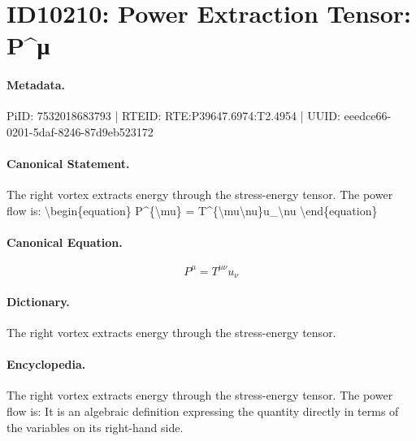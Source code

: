 \section*{ID10210: Power Extraction Tensor: P\textasciicircum{}μ}
\paragraph{Metadata.}
PiID: 7532018683793 | RTEID: RTE:P39647.6974:T2.4954 | UUID: eeedce66-0201-5daf-8246-87d9eb523172

\paragraph{Canonical Statement.}
The right vortex extracts energy through the stress-energy tensor. The power flow is: \textbackslash{}begin\{equation\} P\textasciicircum{}\{\textbackslash{}mu\} = T\textasciicircum{}\{\textbackslash{}mu\textbackslash{}nu\}u\_\textbackslash{}nu \textbackslash{}end\{equation\}

\paragraph{Canonical Equation.}
\[
P^{\mu} = T^{\mu\nu}u_\nu
\]

\paragraph{Dictionary.}
The right vortex extracts energy through the stress-energy tensor.

\paragraph{Encyclopedia.}
The right vortex extracts energy through the stress-energy tensor. The power flow is: It is an algebraic definition expressing the quantity directly in terms of the variables on its right-hand side.
